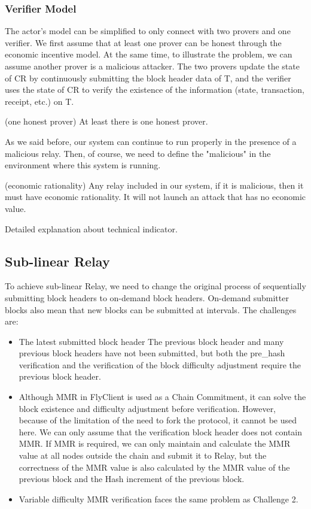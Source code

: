 \subsubsection*{Verifier Model}
The actor’s model can be simplified to only connect with two provers and one verifier. We first assume that at least one prover can be honest through the economic incentive model. At the same time, to illustrate the problem, we can assume another prover is a malicious attacker. The two provers update the state of CR by continuously submitting the block header data of T, and the verifier uses the state of CR to verify the existence of the information (state, transaction, receipt, etc.) on T.

\begin{assumption}
(one honest prover) At least there is one honest prover.
\end{assumption}

As we said before, our system can continue to run properly in the presence of a malicious relay. Then, of course, we need to define the "malicious" in the environment where this system is running.

\begin{assumption}
(economic rationality)  Any relay included in our system, if it is malicious, then it must have economic rationality.  It will not launch an attack that has no economic value.
\end{assumption}


Detailed explanation about technical indicator.

\subsection*{Sub-linear Relay}

To achieve sub-linear Relay, we need to change the original process of sequentially submitting block headers to on-demand block headers. On-demand submitter blocks also mean that new blocks can be submitted at intervals. The challenges are:

\begin{itemize}
    \item The latest submitted block header The previous block header and many previous block headers have not been submitted, but both the pre\_hash verification and the verification of the block difficulty adjustment require the previous block header.
    
    \item Although MMR in FlyClient is used as a Chain Commitment, it can solve the block existence and difficulty adjustment before verification. However, because of the limitation of the need to fork the protocol, it cannot be used here. We can only assume that the verification block header does not contain MMR. If MMR is required, we can only maintain and calculate the MMR value at all nodes outside the chain and submit it to Relay, but the correctness of the MMR value is also calculated by the MMR value of the previous block and the Hash increment of the previous block.
    \item Variable difficulty MMR verification faces the same problem as Challenge 2.
\end{itemize}

